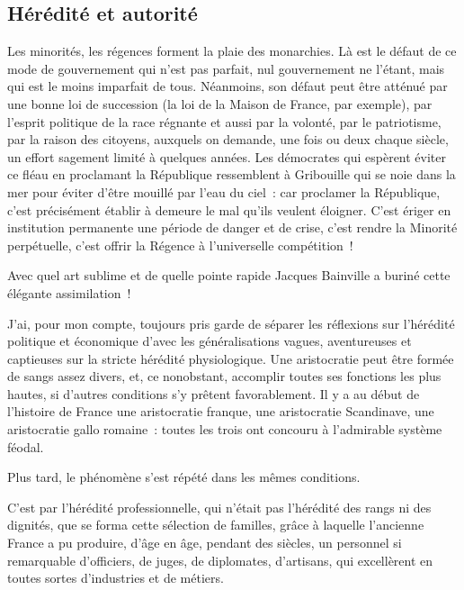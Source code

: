 \documentclass[french,twoside]{book} %
\newcommand{\astermono}{\medskip\centerline{\color{rubric}\large\selectfont{\syms ✻}}\medskip\par}%
\begin{document}
\subsection[{Hérédité et autorité}]{Hérédité et autorité}
\noindent Les minorités, les régences forment la plaie des monarchies. Là est le défaut de ce mode de gouvernement qui n’est pas parfait, nul gouvernement ne l’étant, mais qui est le moins imparfait de tous. Néanmoins, son défaut peut être atténué par une bonne loi de succession (la loi de la Maison de France, par exemple), par l’esprit politique de la race régnante et aussi par la volonté, par le patriotisme, par la raison des citoyens, auxquels on demande, une fois ou deux chaque siècle, un effort sagement limité à quelques années. Les démocrates qui espèrent éviter ce fléau en proclamant la République ressemblent à Gribouille qui se noie dans la mer pour éviter d’être mouillé par l’eau du ciel : car proclamer la République, c’est précisément établir à demeure le mal qu’ils veulent éloigner. C’est ériger en institution permanente une période de danger et de crise, c’est rendre la Minorité perpétuelle, c’est offrir la Régence à l’universelle compétition !\par
Avec quel art sublime et de quelle pointe rapide Jacques Bainville a buriné cette élégante assimilation !\par

\astermono

\noindent J’ai, pour mon compte, toujours pris garde de séparer les réflexions sur l’hérédité politique et économique d’avec les généralisations vagues, aventureuses et captieuses sur la stricte hérédité physiologique. Une aristocratie peut être formée de sangs assez divers, et, ce nonobstant, accomplir toutes ses fonctions les plus hautes, si d’autres conditions s’y prêtent favorablement. Il y a au début de l’histoire de France une aristocratie franque, une aristocratie Scandinave, une aristocratie gallo romaine : toutes les trois ont concouru à l’admirable système féodal.\par
Plus tard, le phénomène s’est répété dans les mêmes conditions.\par
C’est par l’hérédité professionnelle, qui n’était pas l’hérédité des rangs ni des dignités, que se forma cette sélection de familles, grâce à laquelle l’ancienne France a pu produire, d’âge en âge, pendant des siècles, un personnel si remarquable d’officiers, de juges, de diplomates, d’artisans, qui excellèrent en toutes sortes d’industries et de métiers.\par
\end{document}
